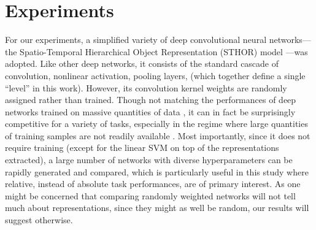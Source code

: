 \documentclass[10pt,twocolumn,letterpaper]{article}
\begin{document}
\section{Experiments}
\label{sec:exp}

For our experiments, a simplified variety of deep convolutional neural networks---the Spatio-Temporal Hierarchical Object Representation (STHOR) model \cite{pinto2009high, sthor}---{was} adopted.
Like other deep networks, it consists of the standard cascade of convolution, nonlinear activation, pooling layers, \etc (which together define a single ``level'' in this work). However, its convolution kernel weights are  randomly assigned rather than trained.
Though not matching the performances of deep networks trained on massive quantities of data \cite{krizhevsky2012imagenet}, it can in fact be surprisingly competitive for a variety of tasks, especially in the regime where large quantities of training samples are not readily available \cite{pinto2009high, cox2011beyond, viglarge}.
Most importantly, since it does not require training (except for the linear SVM on top of the representations extracted), a large number of networks with diverse hyperparameters can be rapidly generated and compared, which is particularly useful in this study where relative, instead of absolute task performances, are of primary interest. 
As one might be concerned that comparing randomly weighted networks will not tell much about representations, since they might as well be random, our results will suggest otherwise.

\newcommand{\expsettings}{In other words, 32 channels of filters in the top level's convolution layers, a simple setting with reasonable performance.
Following the terminology in recent work, shallow and deep neurons corresponded to \texttt{pool1} and \texttt{pool2} layers respectively.
Stimulus dimensionalities of the shallow and deep neurons {were} $N=121$ and $441$ (\ie spatially overlapping $11\times11$ and $21\times21$ receptive fields). %
Other minor changes included: nonlinear activations all simplified to \emph{ReLU} \cite{krizhevsky2012imagenet} mode and normalizations all in subtractive mode.
Overall, the architectures were more similar to those in \cite{simonyan2014very}, except pooling operations can be \emph{average}, \emph{squared}, or \emph{max-like} in our case.
}
\end{document}
